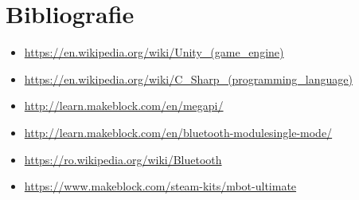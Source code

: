 \documentclass[12pt,a4paper]{article}
\begin{document}
	\pagebreak
	\section{Bibliografie}
	
	\begin{itemize}
		\item \url{https://en.wikipedia.org/wiki/Unity_(game_engine)}
		\item \url{https://en.wikipedia.org/wiki/C_Sharp_(programming_language)}
		\item \url{http://learn.makeblock.com/en/megapi/}
		\item \url{http://learn.makeblock.com/en/bluetooth-modulesingle-mode/}
		\item \url{https://ro.wikipedia.org/wiki/Bluetooth}
		\item \url{https://www.makeblock.com/steam-kits/mbot-ultimate}
	\end{itemize}
	
\end{document}
